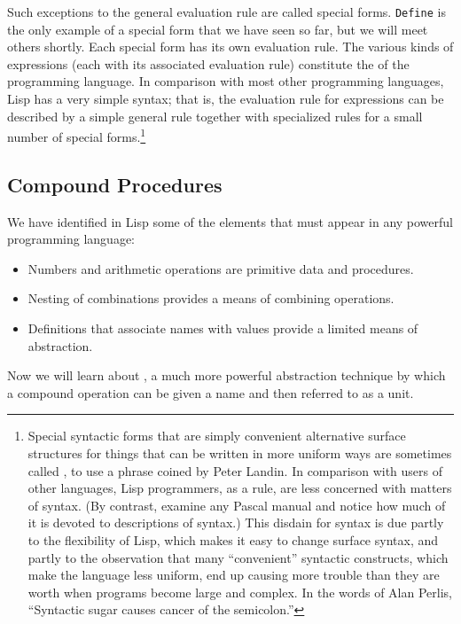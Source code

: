 Such exceptions to the general evaluation rule are called
special forms.  \texttt{Define} is the only example of a
special form that we have seen so far, but we will meet others
shortly.  Each special form has its own evaluation rule. The various
kinds of expressions (each with its associated evaluation rule)
constitute the  of the programming language.  In
comparison with most other programming languages, Lisp has a very
simple syntax; that is, the evaluation rule for expressions can be
described by a simple general rule together with specialized rules for
a small number of special forms.\footnote{Special syntactic forms that
  are simply convenient alternative surface structures for things that
  can be written in more uniform ways are sometimes called
  , to use a phrase coined by Peter Landin.  In
  comparison with users of other languages, Lisp programmers, as a
  rule, are less concerned with matters of syntax.  (By contrast,
  examine any Pascal manual and notice how much of it is devoted to
  descriptions of syntax.)  This disdain for syntax is due partly to
  the flexibility of Lisp, which makes it easy to change surface
  syntax, and partly to the observation that many ``convenient''
  syntactic constructs, which make the language less uniform, end up
  causing more trouble than they are worth when programs become large
  and complex.  In the words of Alan Perlis, ``Syntactic sugar causes
  cancer of the semicolon.''}

\subsection{Compound Procedures}
\label{sec:1.1.4}

We have identified in Lisp some of the elements that must appear in
any powerful programming language:

\begin{itemize}
\item Numbers and arithmetic operations are 
primitive data and procedures.
\item Nesting of combinations provides a means of 
combining operations.
\item Definitions that associate names with values provide a
limited means of abstraction.
\end{itemize}

Now we will learn about
, a much more powerful abstraction
technique by which a compound operation can be given a name and then
referred to as a unit.

